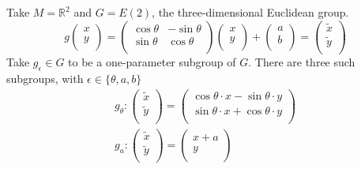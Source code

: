 \begin{example}[]
  Take $M = \mathbb{R}^2$  and $G = E(2)$, the three-dimensional Euclidean group.
  \begin{equation}
    g 
    \begin{pmatrix}
    x \\
    y \\
    \end{pmatrix} =
    \begin{pmatrix}
     \cos \theta & - \sin \theta \\
     \sin \theta & \cos \theta \\
    \end{pmatrix} 
    \begin{pmatrix}
    x \\
    y \\
    \end{pmatrix} + 
    \begin{pmatrix}
    a \\
    b \\
    \end{pmatrix}
    =
    \begin{pmatrix}
    \tilde{x} \\
    \tilde{y} \\
    \end{pmatrix}
  \end{equation}
  Take $g_\epsilon \in G$ to be a one-parameter subgroup of $G$.
  There are three such subgroups, with $\epsilon \in \{\theta, a, b\}$
   \begin{gather}
    g_\theta: 
    \begin{pmatrix}
    \tilde{x} \\
    \tilde{y} \\
    \end{pmatrix} = 
    \begin{pmatrix}
    \cos \theta \cdot x - \sin \theta \cdot y \\
    \sin \theta \cdot x + \cos \theta \cdot y \\
    \end{pmatrix} \\
    g_a \colon
    \begin{pmatrix}
    \tilde{x} \\
    \tilde{y} \\
    \end{pmatrix} = 
    \begin{pmatrix}
    x + a \\
    y \\

\end{pmatrix}
\end{gather}
\end{example}
